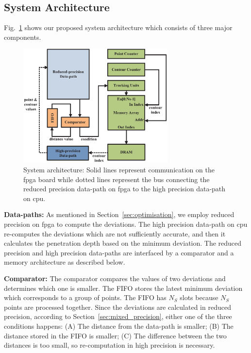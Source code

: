 \subsection{System Architecture}
Fig.~\ref{fig:arch} shows our proposed system architecture which consists of three major components.

\begin{figure}[t!]
\begin{center}
\includegraphics[width=0.7\textwidth]{mixed_precision/figures/arch}
\end{center}
\caption{System architecture:
Solid lines represent communication on the \gls{fpga} board while dotted lines represent the bus connecting the reduced precision data-path on \gls{fpga} to the high precision data-path on \gls{cpu}.
}
\label{fig:arch}
\end{figure}

\noindent \textbf{Data-paths:}
As mentioned in Section~\ref{sec:optimisation}, we employ reduced precision on \gls{fpga} to compute the deviations.
The high precision data-path on \gls{cpu} re-computes the deviations which are not sufficiently accurate,
and then it calculates the penetration depth based on the minimum deviation.
The reduced precision and high precision data-paths are interfaced by a comparator and a memory architecture as described below.

\noindent \textbf{Comparator:}
The comparator compares the values of two deviations and determines which one is smaller.
The FIFO stores the latest minimum deviation which corresponds to a group of points.
The FIFO has $N_{S}$ slots because $N_S$ points are processed together.
Since the deviations are calculated in reduced precision, according to Section~\ref{sec:mixed_precision}, 
either one of the three conditions happens:
(A) The distance from the data-path is smaller; 
(B) The distance stored in the FIFO is smaller; 
(C) The difference between the two distances is too small, so re-computation in high precision is necessary.

